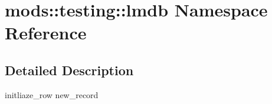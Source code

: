 \hypertarget{namespacemods_1_1testing_1_1lmdb}{}\section{mods\+:\+:testing\+:\+:lmdb Namespace Reference}
\label{namespacemods_1_1testing_1_1lmdb}


\subsection{Detailed Description}
initliaze\+\_\+row new\+\_\+record 